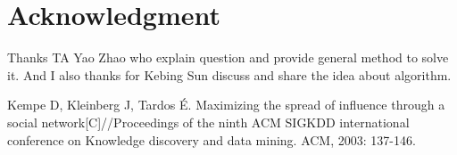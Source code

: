 \documentclass[conference,compsoc]{IEEEtran}
\begin{document}
\section*{Acknowledgment}
Thanks TA Yao Zhao who explain question and provide general method to solve it.
And I also thanks for Kebing Sun discuss and share the idea about algorithm.


\begin{thebibliography}{1}
Kempe D, Kleinberg J, Tardos É. Maximizing the spread of influence through a
social network[C]//Proceedings of the ninth ACM SIGKDD international conference
on Knowledge discovery and data mining. ACM, 2003: 137-146.

\end{thebibliography}

\end{document}
